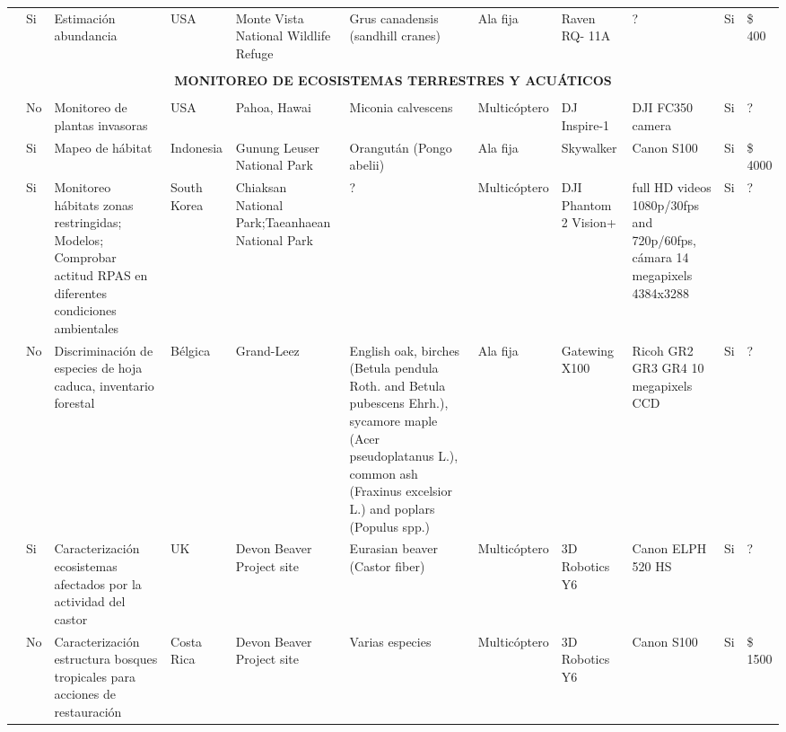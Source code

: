 \documentclass[]{interact}
\theoremstyle{plain}%
\theoremstyle{definition}
\theoremstyle{remark}
\begin{document}
\begin{landscape}
\begin{table}
\begin{tabular}{p{3cm}p{1.2cm}p{3cm}p{1cm}p{2cm}p{2cm}p{1cm}p{2cm}p{2cm}p{1cm}p{2cm}}
\cite{christie_unmanned_2016}  &  Si & Estimación abundancia & USA &  Monte Vista National Wildlife Refuge & Grus canadensis (sandhill cranes)  & Ala fija & Raven RQ- 11A & ?  & Si & \$ 400 \\ 

\multicolumn{11}{c}{} \\
\multicolumn{11}{c}{{\bf  MONITOREO DE ECOSISTEMAS TERRESTRES Y ACUÁTICOS  }} \\
\multicolumn{11}{c}{} \\

\cite{perroy_assessing_2017}  & No & Monitoreo de plantas invasoras & USA & Pahoa, Hawai & Miconia calvescens & Multicóptero & DJ Inspire-1 & DJI FC350 camera  & Si & ?  \\ 

\cite{szantoi_mapping_2017}  & Si & Mapeo de hábitat & Indonesia & Gunung Leuser National Park & Orangután (Pongo abelii)  & Ala fija & Skywalker & Canon S100  & Si & \$ 4000 \\ 
  
\cite{ivosevic_use_2015}  & Si & Monitoreo hábitats zonas restringidas; Modelos; Comprobar actitud  RPAS en diferentes condiciones ambientales & South Korea & Chiaksan National Park;Taeanhaean National Park &  ? & Multicóptero & DJI Phantom 2 Vision+  & full HD videos 1080p/30fps and 720p/60fps, cámara 14 megapixels 4384x3288 & Si & ? \\ 
  
\cite{lisein_discrimination_2015}  & No & Discriminación de especies de  hoja caduca, inventario forestal & Bélgica & Grand-Leez & English oak, birches (Betula pendula Roth. and Betula pubescens Ehrh.), sycamore maple (Acer pseudoplatanus L.), common ash (Fraxinus excelsior L.) and poplars (Populus spp.) & Ala fija & Gatewing X100  & Ricoh GR2 GR3 GR4 10 megapixels CCD  & Si & ?  \\ 
  
\cite{puttock_aerial_2015}  & Si & Caracterización ecosistemas afectados por la actividad del castor & UK & Devon Beaver Project site & Eurasian beaver (Castor fiber) & Multicóptero & 3D Robotics Y6 & Canon ELPH 520 HS  & Si & ?  \\ 
  
\cite{zahawi_using_2015}  & No & Caracterización estructura bosques tropicales para acciones de restauración & Costa Rica & Devon Beaver Project site & Varias especies & Multicóptero & 3D Robotics Y6 & Canon S100  & Si & \$ 1500 \\ 
  

\end{tabular}
\end{table}
\end{landscape}
\end{document}
